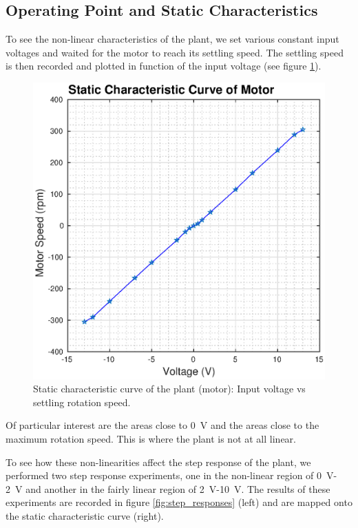 \subsection{Operating Point and Static Characteristics}

To see the  non-linear  characteristics  of the plant, we set various constant
input voltages and waited for  the  motor  to  reach  its  settling speed. The
settling speed is then recorded and plotted in function of the  input  voltage
(see figure \ref{fig:static_cc}).

\begin{figure}[t]
    \centering
    \includegraphics[width=\linewidth]{images/static_cc}
    \caption{Static characteristic curve of the plant (motor): Input voltage vs settling rotation speed.}
    \label{fig:static_cc}
\end{figure}

Of particular interest  are  the  areas  close  to \SI{0}{\volt} and the areas
close to  the  maximum  rotation  speed. This is where the plant is not at all
linear.

To see  how  these  non-linearities  affect the step response of the plant, we
performed  two  step  response  experiments,  one in the non-linear region  of
\SI{0}{\volt}-\SI{2}{\volt}  and  another  in  the  fairly  linear  region  of
\SI{2}{\volt}-\SI{10}{\volt}. The results of these experiments are recorded in
figure  \ref{fig:step_responses}  (left)  and   are  mapped  onto  the  static
characteristic curve (right).

